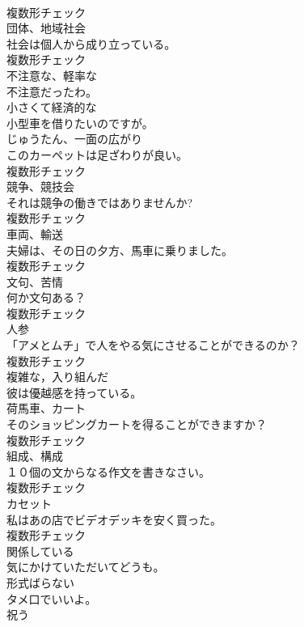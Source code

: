 \documentclass[8pt]{extreport}
\begin{document}
\begin{CJK}{UTF8}{min}
\\	複数形チェック
\\	[名詞]	団体、地域社会	
\\	社会は個人から成り立っている。	
\\	複数形チェック
\\	[形容詞]	不注意な、軽率な	
\\	不注意だったわ。	
\\	[形容詞]	小さくて経済的な	
\\	小型車を借りたいのですが。	
\\	[名詞]	じゅうたん、一面の広がり	
\\	このカーペットは足ざわりが良い。	
\\	複数形チェック
\\	[名詞]	競争、競技会	
\\	それは競争の働きではありませんか?	
\\	複数形チェック
\\	[名詞]	車両、輸送	
\\	夫婦は、その日の夕方、馬車に乗りました。	
\\	複数形チェック
\\	[名詞]	文句、苦情	
\\	何か文句ある？	
\\	複数形チェック
\\	[名詞]	人参	
\\	「アメとムチ」で人をやる気にさせることができるのか？	
\\	複数形チェック
\\	[形容詞]	複雑な，入り組んだ	
\\	彼は優越感を持っている。	
\\	[名詞]	荷馬車、カート	
\\	そのショッピングカートを得ることができますか？	
\\	複数形チェック
\\	[名詞]	組成、構成	
\\	１０個の文からなる作文を書きなさい。	
\\	複数形チェック
\\	[名詞]	カセット	
\\	私はあの店でビデオデッキを安く買った。	
\\	複数形チェック
\\	[動詞]	関係している	
\\	気にかけていただいてどうも。	
\\	[形容詞]	形式ばらない	
\\	タメ口でいいよ。	
\\	[動詞]	祝う	

\end{CJK}
\end{document}
